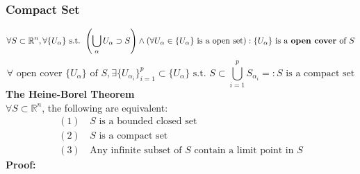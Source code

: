 \documentclass{article}
\newcommand{\R}{\mathbb{R}}
\newcommand{\st}{\mbox{ s.t. }}
\newcommand{\0}{{\bf{0}}}
\begin{document}
\subsubsection{Compact Set}
$$\forall S\subset\R^n,\forall\{U_\alpha\}\st\left(\bigcup_\alpha U_\alpha\supset S\right)\land(\forall U_\alpha\in\{U_\alpha\}\mbox{ is a open set}):\{U_\alpha\}\mbox{ is a \textbf{open cover} of }S$$
$$\forall\mbox{ open cover }\{U_\alpha\}\mbox{ of }S,\exists\{U_{\alpha_i}\}_{i=1}^p\subset\{U_\alpha\}\st S\subset\bigcup_{i=1}^p S_{\alpha_i}=:S\mbox{ is a compact set}$$
\textbf{The Heine-Borel Theorem}\\
$\forall S\subset\R^n$, the following are equivalent:
\begin{equation}
\begin{split}
    (1)\,&S\mbox{ is a bounded closed set}\\
    (2)\,&S\mbox{ is a compact set}\\
    (3)\,&\mbox{Any infinite subset of }S\mbox{ contain a limit point in }S
\end{split}
\end{equation}
\textbf{Proof:}
\end{document}
